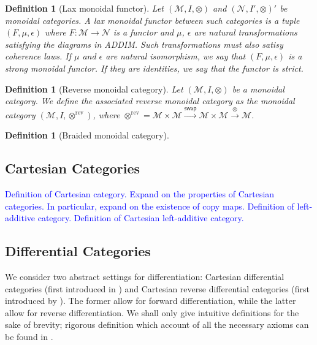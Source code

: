 \documentclass[11pt,a4paper,openright,twoside]{report}
\theoremstyle{plain}
\newtheorem{definition}[proposition]{Definition}
\theoremstyle{definition}
\begin{document}
\begin{definition}[Lax monoidal functor]
  Let $(\mathcal{M}, I, \otimes)$ and $(\mathcal{N}, I', \otimes)'$ be monoidal categories. A lax monoidal functor between such categories is a tuple $(F, \mu, \epsilon)$ where $F: \mathcal{M} \to \mathcal{N}$ is a functor and $\mu$, $\epsilon$ are natural transformations satisfying the diagrams in ADDIM. Such transformations must also satisy coherence laws. If $\mu$ and $\epsilon$ are natural isomorphism, we say that $(F, \mu, \epsilon)$ is a strong monoidal functor. If they are identities, we say that the functor is strict.
\end{definition}

\begin{definition}[Reverse monoidal category]
  Let $(\mathcal{M}, I, \otimes)$ be a monoidal category. We define the associated reverse monoidal category as the monoidal category $(\mathcal{M}, I, \otimes^{\mathrm{rev}})$, where $\otimes^{\mathrm{rev}} = \mathcal{M} \times \mathcal{M} \stackrel{\mathsf{swap}}{\rightarrow} \mathcal{M} \times \mathcal{M} \stackrel{\otimes}{\rightarrow} \mathcal{M}$.
\end{definition}

\begin{definition}[Braided monoidal category]
  
\end{definition}


\subsection{Cartesian Categories}


\textcolor{blue}{Definition of Cartesian category.}
\textcolor{blue}{Expand on the properties of Cartesian categories. In particular, expand on the existence of copy maps.}
\textcolor{blue}{Definition of left-additive category.}
\textcolor{blue}{Definition of Cartesian left-additive category.}




\subsection{Differential Categories}

We consider two abstract settings for differentiation: Cartesian differential categories (first introduced in \cite{bluteDifferentialCategories2006}) and Cartesian reverse differential categories (first introduced by \cite{cockettReverseDerivativeCategories2019}). The former allow for forward differentiation, while the latter allow for reverse differentiation. We shall only give intuitive definitions for the sake of brevity; rigorous definition which account of all the necessary axioms can be found in \cite{cockettReverseDerivativeCategories2019}.
\end{document}
